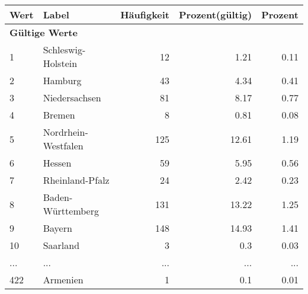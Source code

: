      \begin{longtable}{lXrrr}
     \toprule
     \textbf{Wert} & \textbf{Label} & \textbf{Häufigkeit} & \textbf{Prozent(gültig)} & \textbf{Prozent} \\
     \endhead
     \midrule
     \multicolumn{5}{l}{\textbf{Gültige Werte}}\\
        1 & \multicolumn{1}{X}{Schleswig-Holstein} & %
          \num{12} &
          \num[round-mode=places,round-precision=2]{1.21} &
          \num[round-mode=places,round-precision=2]{0.11} \\
        2 & \multicolumn{1}{X}{Hamburg} & %
          \num{43} &
          \num[round-mode=places,round-precision=2]{4.34} &
          \num[round-mode=places,round-precision=2]{0.41} \\
        3 & \multicolumn{1}{X}{Niedersachsen} & %
          \num{81} &
          \num[round-mode=places,round-precision=2]{8.17} &
          \num[round-mode=places,round-precision=2]{0.77} \\
        4 & \multicolumn{1}{X}{Bremen} & %
          \num{8} &
          \num[round-mode=places,round-precision=2]{0.81} &
          \num[round-mode=places,round-precision=2]{0.08} \\
        5 & \multicolumn{1}{X}{Nordrhein-Westfalen} & %
          \num{125} &
          \num[round-mode=places,round-precision=2]{12.61} &
          \num[round-mode=places,round-precision=2]{1.19} \\
        6 & \multicolumn{1}{X}{Hessen} & %
          \num{59} &
          \num[round-mode=places,round-precision=2]{5.95} &
          \num[round-mode=places,round-precision=2]{0.56} \\
        7 & \multicolumn{1}{X}{Rheinland-Pfalz} & %
          \num{24} &
          \num[round-mode=places,round-precision=2]{2.42} &
          \num[round-mode=places,round-precision=2]{0.23} \\
        8 & \multicolumn{1}{X}{Baden-Württemberg} & %
          \num{131} &
          \num[round-mode=places,round-precision=2]{13.22} &
          \num[round-mode=places,round-precision=2]{1.25} \\
        9 & \multicolumn{1}{X}{Bayern} & %
          \num{148} &
          \num[round-mode=places,round-precision=2]{14.93} &
          \num[round-mode=places,round-precision=2]{1.41} \\
        10 & \multicolumn{1}{X}{Saarland} & %
          \num{3} &
          \num[round-mode=places,round-precision=2]{0.3} &
          \num[round-mode=places,round-precision=2]{0.03} \\
       ... & ... & ... & ... & ... \\
        422 & \multicolumn{1}{X}{Armenien} & %
          \num{1} &
          \num[round-mode=places,round-precision=2]{0.1} &
          \num[round-mode=places,round-precision=2]{0.01} \\


\end{longtable}
